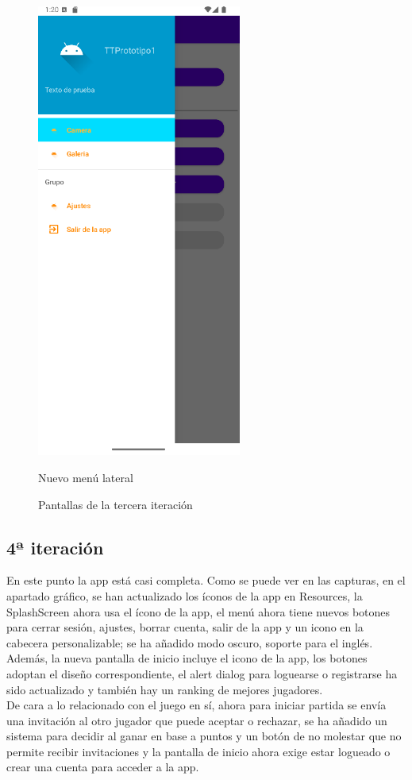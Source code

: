 \documentclass[a4paper,openright,12pt]{article}
\begin{document}
\begin{figure}[htp]
\begin{minipage}{0.3\textwidth}
        \includegraphics[width=0.6\textwidth]{Images/Vista_It3_2.png} 
        \caption{Nuevo menú lateral}
        \label{fig:menú lateral}
    \end{minipage}
    \caption{Pantallas de la tercera iteración}
    \label{fig:tercera iteración}
\end{figure}

\subsection{4ª iteración}
En este punto la app está casi completa. Como se puede ver en las capturas, en el apartado gráfico, se han actualizado los íconos de la app en Resources, la SplashScreen ahora usa el ícono de la app, el menú ahora tiene nuevos botones para cerrar sesión, ajustes, borrar cuenta, salir de la app y un icono en la cabecera personalizable; se ha añadido modo oscuro, soporte para el inglés. Además, la nueva pantalla de inicio incluye el icono de la app, los botones adoptan el diseño correspondiente, el alert dialog para loguearse o registrarse ha sido actualizado y también hay un ranking de mejores jugadores. \\
De cara a lo relacionado con el juego en sí, ahora para iniciar partida se envía una invitación al otro jugador que puede aceptar o rechazar, se ha añadido un sistema para decidir al ganar en base a puntos y un botón de no molestar que no permite recibir invitaciones y la pantalla de inicio ahora exige estar logueado o crear una cuenta para acceder a la app.
\end{document}
